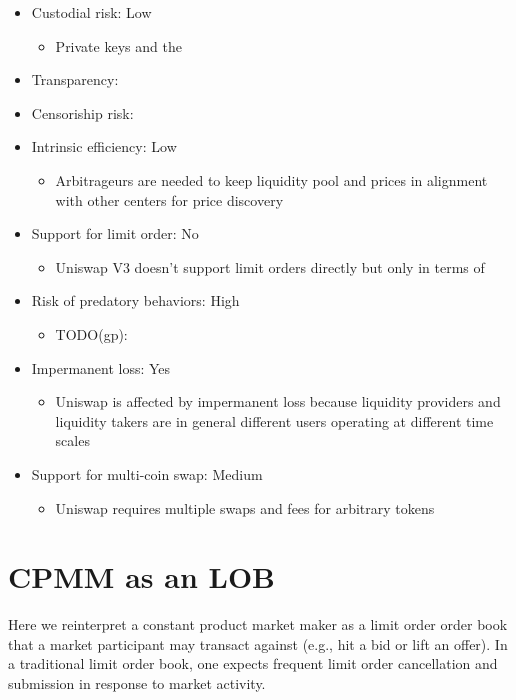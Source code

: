 \documentclass[11pt, reqno]{amsart}
\theoremstyle{definition}
\theoremstyle{remark}
\begin{document}
\begin{itemize}
	\item Custodial risk: Low
	      \begin{itemize}
		      \item Private keys and the
	      \end{itemize}
	\item Transparency:
	\item Censoriship risk:
	\item Intrinsic efficiency: Low
	      \begin{itemize}
		      \item Arbitrageurs are needed to keep liquidity pool and prices in alignment with other centers for price discovery
	      \end{itemize}
	\item Support for limit order: No
	      \begin{itemize}
		      \item Uniswap V3 doesn't support limit orders directly but only in terms of
	      \end{itemize}
	\item Risk of predatory behaviors: High
	      \begin{itemize}
		      \item TODO(gp):
	      \end{itemize}
	\item Impermanent loss: Yes
	      \begin{itemize}
		      \item Uniswap is affected by impermanent loss because liquidity providers and liquidity takers are in general different users operating at different time scales
	      \end{itemize}
	\item Support for multi-coin swap: Medium
	      \begin{itemize}
		      \item Uniswap requires multiple swaps and fees for arbitrary tokens
	      \end{itemize}
\end{itemize}


\section{CPMM as an LOB}

Here we reinterpret a constant product market maker as a limit order order book
that a market participant may transact against (e.g., hit a bid or lift an
offer). In a traditional limit order book, one expects frequent limit order
cancellation and submission in response to market activity.
\end{document}
